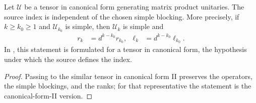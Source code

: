 \begin{lemma}
    \label{index-well-defined}
    \leanok
    Let $\mathcal U$ be a tensor in canonical form generating matrix product
    unitaries. The source index is independent of the chosen simple blocking.
    More precisely, if $k\geq k_0\geq1$ and $\mathcal U_{k_0}$ is simple, then
    $\mathcal U_k$ is simple and
    \begin{align}
        r_k    & =d^{k-k_0}r_{k_0},    &
        \ell_k & =d^{k-k_0}\ell_{k_0}.
    \end{align}
    In \cite[Proposition~IV.2]{Cirac2017MPU}, this statement is formulated for a tensor in canonical
    form, the hypothesis under which the source defines the index.
\end{lemma}

\begin{proof}\leanok
    Passing to the similar tensor in canonical form II preserves the
    operators, the simple blockings, and the ranks; for that representative the
    statement is the canonical-form-II version.
\end{proof}

